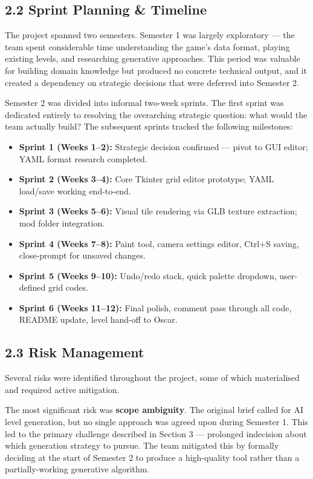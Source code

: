 \subsection{2.2 Sprint Planning \&
Timeline}\label{sprint-planning-timeline}

The project spanned two semesters. Semester 1 was largely exploratory
--- the team spent considerable time understanding the game's data
format, playing existing levels, and researching generative approaches.
This period was valuable for building domain knowledge but produced no
concrete technical output, and it created a dependency on strategic
decisions that were deferred into Semester 2.

Semester 2 was divided into informal two-week sprints. The first sprint
was dedicated entirely to resolving the overarching strategic question:
what would the team actually build? The subsequent sprints tracked the
following milestones:

\begin{itemize}
\tightlist
\item
  \textbf{Sprint 1 (Weeks 1--2):} Strategic decision confirmed --- pivot
  to GUI editor; YAML format research completed.
\item
  \textbf{Sprint 2 (Weeks 3--4):} Core Tkinter grid editor prototype;
  YAML load/save working end-to-end.
\item
  \textbf{Sprint 3 (Weeks 5--6):} Visual tile rendering via GLB texture
  extraction; mod folder integration.
\item
  \textbf{Sprint 4 (Weeks 7--8):} Paint tool, camera settings editor,
  Ctrl+S saving, close-prompt for unsaved changes.
\item
  \textbf{Sprint 5 (Weeks 9--10):} Undo/redo stack, quick palette
  dropdown, user-defined grid codes.
\item
  \textbf{Sprint 6 (Weeks 11--12):} Final polish, comment pass through
  all code, README update, level hand-off to Oscar.
\end{itemize}

\subsection{2.3 Risk Management}\label{risk-management}

Several risks were identified throughout the project, some of which
materialised and required active mitigation.

The most significant risk was \textbf{scope ambiguity}. The original
brief called for AI level generation, but no single approach was agreed
upon during Semester 1. This led to the primary challenge described in
Section 3 --- prolonged indecision about which generation strategy to
pursue. The team mitigated this by formally deciding at the start of
Semester 2 to produce a high-quality tool rather than a
partially-working generative algorithm.

